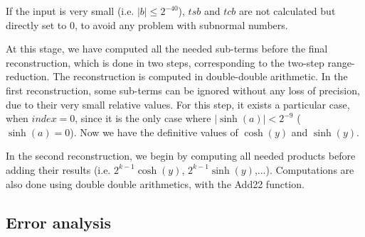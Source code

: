 If the input is very small (i.e. $|b| \leq 2^{-40}$), $tsb$ and $tcb$
are not calculated but directly set to $0$, to avoid any problem with
subnormal numbers.


At this stage, we have computed all the needed sub-terms before the
final reconstruction, which is done in two steps, corresponding to the
two-step range-reduction. The reconstruction is computed in
double-double arithmetic.  In the first reconstruction, some sub-terms
can be ignored without any loss of precision, due to their very small
relative values.  For this step, it exists a particular case, when
$index = 0$, since it is the only case where $|\sinh(a)| < 2^{-9}$
($\sinh(a) = 0$).  Now we have the definitive values of $\cosh(y)$ and
$\sinh(y)$.

In the second reconstruction, we begin by computing all needed
products before adding their results (i.e. $2^{k-1}\cosh(y)$,
$2^{k-1}\sinh(y)$,...).  Computations are also done using double
double arithmetics, with the Add22 function.



\subsection{Error analysis}


